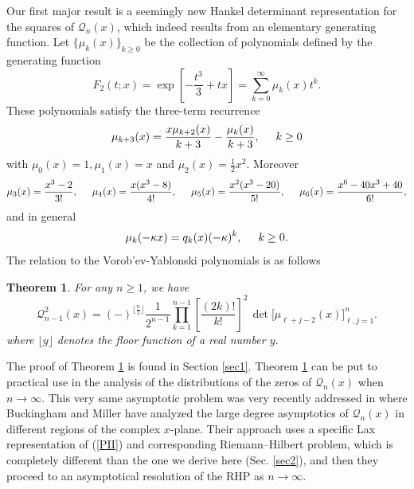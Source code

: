 \documentclass[10pt,oneside,reqno]{amsart}
\numberwithin{equation}{section}
\newtheorem{theorem}{Theorem}[section]
\def\bth{\begin{theorem}}
\def\et{\end{theorem}}
\def\be{\begin{equation}}
\def\ee{\end{equation}}
\def\eqref#1{(\ref{#1})}
\begin{document}
Our first major result is a seemingly new Hankel determinant representation for the squares of $\mathcal{Q}_n(x)$,
which indeed results from an elementary generating function. Let $\{\mu_k(x)\}_{k\geq0}$ be the collection of polynomials defined by the generating
function
\be\label{gen2}
  F_2(t;x) = \exp\left[-\frac{t^3}{3}+tx\right] = \sum_{k=0}^{\infty}\mu_k(x)t^k.
\ee
These polynomials satisfy the three-term recurrence 
\begin{equation}\label{rec1}
  \mu_{k+3}(x) = \frac{x\mu_{k+2}(x)}{k+3}-\frac{\mu_k(x)}{k+3},\hspace{0.5cm}k\geq 0
\end{equation}
with $\mu_0(x)=1,\mu_1(x)=x$ and $\mu_2(x)=\frac{1}{2}x^2$. Moreover
\begin{equation*}
  \mu_3(x) = \frac{x^3-2}{3!},\hspace{0.5cm}\mu_4(x) = \frac{x(x^3-8)}{4!},\hspace{0.5cm}\mu_5(x)=\frac{x^2(x^3-20)}{5!},\hspace{0.5cm}\mu_6(x)=\frac{x^6-40x^3+40}{6!},
\end{equation*}
and in general
\begin{equation*}
 \mu_k(-\kappa x) = q_k(x)(-\kappa)^k,\hspace{0.5cm}k\geq 0.
\end{equation*}
The relation to the Vorob'ev-Yablonski polynomials is as follows
\bth\label{theo1} For any $n\geq 1$, we have
\be\label{the1}
  \mathcal{Q}_{n-1}^2(x) = (-)^{\lfloor\frac{n}{2}\rfloor}\frac{1}{2^{n-1}}\prod_{k=1}^{n-1}\left[\frac{(2k)!}{k!}\right]^2\,\det\Big[\mu_{\ell+j-2}(x)\Big]_{\ell,j=1}^{n}.
\ee
where $\lfloor y\rfloor$ denotes the floor function of a real number $y$.
\et
The proof of Theorem \ref{theo1} is found in Section \ref{sec1}. Theorem \ref{theo1} can be put to practical use in the analysis of the distributions of the zeros of $\mathcal Q_n(x)$ when $n\to \infty$. This very same asymptotic problem was very recently addressed in \cite{BM} where Buckingham and Miller have analyzed the large degree asymptotics of $\mathcal{Q}_n(x)$ in different regions of the complex $x$-plane. Their approach
uses a specific Lax representation of \eqref{PII} and corresponding Riemann--Hilbert problem, which is completely different than the one we derive here (Sec. \ref{sec2}),  and then they proceed to an  asymptotical resolution of the RHP as  $n\rightarrow\infty$.\smallskip
\end{document}
